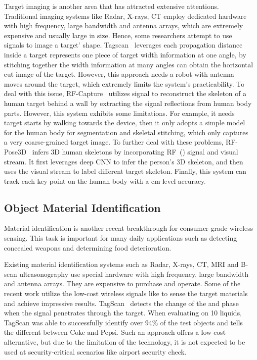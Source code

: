Target imaging is another area that has attracted extensive attentions. Traditional imaging systems like Radar, X-rays, CT employ dedicated
hardware with high frequency, large bandwidth and antenna arrays, which are extremely expensive and usually large in size. Hence, some
researchers attempt to use \RF signals to image a target' shape. Tagscan~\cite{Tagscan} leverages each propagation distance inside a target
represents one piece of target width information at one angle, by stitching together the width information at many angles can obtain the
horizontal cut image of the target. However, this approach needs a robot with antenna moves around the target, which extremely limits the
system's practicability. To deal with this issue, RF-Capture~\cite{Adib2017Capturing} utilizes \FMCW signal to reconstruct the skeleton of
a human target behind a wall by extracting the signal reflections from human body parts. However, this system exhibits some limitations.
For example, it needs target starts by walking towards the device, then it only adopts a simple model for the human body for segmentation
and skeletal stitching, which only captures a very coarse-grained target image. To further deal with these problems,
RF-Pose3D~\cite{zhao2018rf} infers 3D human skeletons by incorporating RF~(\FMCW) signal and visual stream. It first leverages deep CNN to infer
the person's 3D skeleton, and then uses the visual stream to label different target skeleton. Finally, this system can track each key point
on the human body with a cm-level accuracy.


\subsection{Object Material Identification}
Material identification is another recent breakthrough for consumer-grade wireless sensing. This task is important for many daily
applications such as detecting concealed weapons and determining food deterioration.

Existing material identification systems such as Radar, X-rays, CT, MRI and B-scan ultrasonography use special hardware with high
frequency, large bandwidth and antenna arrays. They are expensive to purchase and operate. Some of the recent work utilize the low-cost
wireless signals like \RFID to sense the target materials and achieve impressive results. TagScan~\cite{Tagscan} detects the change of the
\RSSI and phase when the \RF signal penetrates through the target. When evaluating on 10 liquids, TagScan was able to successfully identify
over 94\% of the test objects and tells the different between Coke and Pepsi. Such an approach offers a low-cost alternative, but due to
the limitation of the technology, it is not expected to be used at security-critical scenarios like airport security check.





